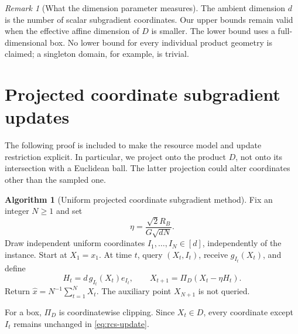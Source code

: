 \documentclass[11pt]{article}
\numberwithin{equation}{section}
\theoremstyle{definition}
\newtheorem{algorithm}[algorithm]{Algorithm}
\theoremstyle{remark}
\newtheorem{remark}[remark]{Remark}
\begin{document}
\begin{remark}[What the dimension parameter measures]
The ambient dimension $d$ is the number of scalar subgradient coordinates. Our upper bounds remain valid when the effective affine dimension of $D$ is smaller. The lower bound uses a full-dimensional box. No lower bound for every individual product geometry is claimed; a singleton domain, for example, is trivial.
\end{remark}

\section{Projected coordinate subgradient updates}\label{sec:coordinate-upper}

The following proof is included to make the resource model and update restriction explicit. In particular, we project onto the product $D$, not onto its intersection with a Euclidean ball. The latter projection could alter coordinates other than the sampled one.

\begin{algorithm}[Uniform projected coordinate subgradient method]\label{alg:rcs}
Fix an integer $N\ge1$ and set
\begin{equation}\label{eq:rcs-eta}
\eta=\frac{\sqrt2R_B}{G\sqrt{dN}}.
\end{equation}
Draw independent uniform coordinates $I_1,\ldots,I_N\in[d]$, independently of the instance. Start at $X_1=x_1$. At time $t$, query $(X_t,I_t)$, receive $g_{I_t}(X_t)$, and define
\begin{equation}\label{eq:rcs-update}
H_t=d\,g_{I_t}(X_t)e_{I_t},\qquad
X_{t+1}=\Pi_D(X_t-\eta H_t).
\end{equation}
Return $\widehat x=N^{-1}\sum_{t=1}^N X_t$. The auxiliary point $X_{N+1}$ is not queried.
\end{algorithm}

For a box, $\Pi_D$ is coordinatewise clipping. Since $X_t\in D$, every coordinate except $I_t$ remains unchanged in \eqref{eq:rcs-update}.
\end{document}
